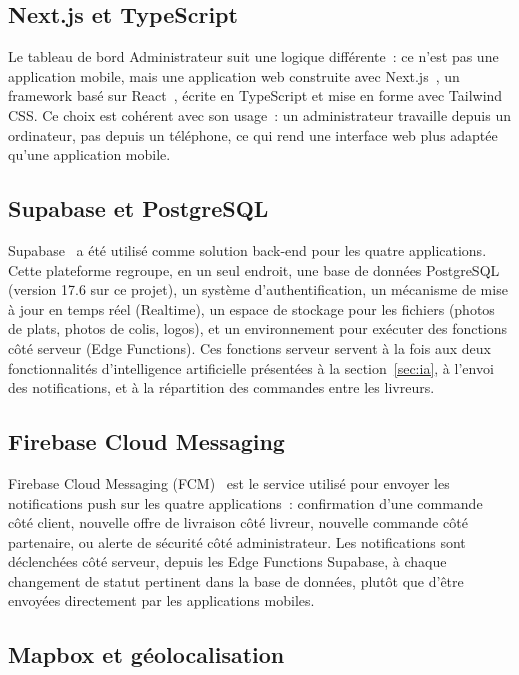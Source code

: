 \documentclass[12pt,fleqn,a4paper]{report}
\begin{document}
\begin{justify}
\subsection{Next.js et TypeScript}

Le tableau de bord Administrateur suit une logique différente~: ce n'est pas une application mobile, mais une application web construite avec Next.js~\cite{nextjs_docs}, un framework basé sur React~\cite{react_docs}, écrite en TypeScript et mise en forme avec Tailwind CSS. Ce choix est cohérent avec son usage~: un administrateur travaille depuis un ordinateur, pas depuis un téléphone, ce qui rend une interface web plus adaptée qu'une application mobile.

\subsection{Supabase et PostgreSQL}

Supabase~\cite{supabase_docs} a été utilisé comme solution back-end pour les quatre applications. Cette plateforme regroupe, en un seul endroit, une base de données PostgreSQL~\cite{postgresql_docs} (version 17.6 sur ce projet), un système d'authentification, un mécanisme de mise à jour en temps réel (Realtime), un espace de stockage pour les fichiers (photos de plats, photos de colis, logos), et un environnement pour exécuter des fonctions côté serveur (Edge Functions). Ces fonctions serveur servent à la fois aux deux fonctionnalités d'intelligence artificielle présentées à la section~\ref{sec:ia}, à l'envoi des notifications, et à la répartition des commandes entre les livreurs.

\subsection{Firebase Cloud Messaging}

Firebase Cloud Messaging (FCM)~\cite{fcm_docs} est le service utilisé pour envoyer les notifications push sur les quatre applications~: confirmation d'une commande côté client, nouvelle offre de livraison côté livreur, nouvelle commande côté partenaire, ou alerte de sécurité côté administrateur. Les notifications sont déclenchées côté serveur, depuis les Edge Functions Supabase, à chaque changement de statut pertinent dans la base de données, plutôt que d'être envoyées directement par les applications mobiles.

\subsection{Mapbox et géolocalisation}


\end{justify}
\end{document}
